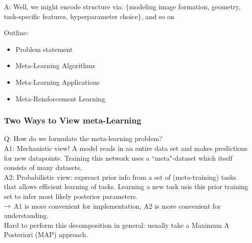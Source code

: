 A: Well, we might encode structure via: $\{$modeling image formation, geometry, task-specific features, hyperparameter choice$\}$, and so on \\


Outline:
\begin{itemize}
\item Problem statement
\item Meta-Learning Algorithms
\item Meta-Learning Applications
\item Meta-Reinforcement Learning
\end{itemize}

\subsubsection{Two Ways to View meta-Learning}

Q: How do we formulate the meta-learning problem? \\

A1: Mechanistic view! A model reads in an entire data set and makes predictions for new datapoints. Training this network uses a ``meta"-dataset which itself consists of many datasets. \\

A2: Probabilistic view: expreact prior info from a set of (meta-training) tasks that allows efficient learning of tasks. Learning a new task usis this prior training set to infer most likely posterior parameters. \\

$\rightarrow$ A1 is more convenient for implementation, A2 is more convenient for understanding. \\

Hard to perform this decomposition in general: usually take a Maximum A Posteriori (MAP) approach. \\

